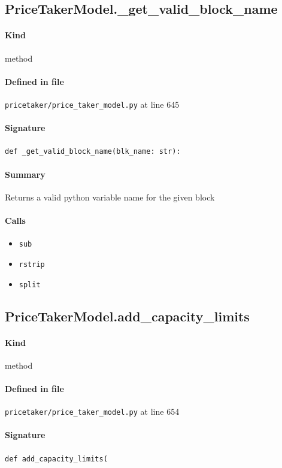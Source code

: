 \documentclass[11pt]{report}
\begin{document}
\subsection{PriceTakerModel.\_get\_valid\_block\_name}
\label{def:pricetaker-price_taker_model.py:PriceTakerModel._get_valid_block_name:L645}
\paragraph{Kind} method
\paragraph{Defined in file} \texttt{pricetaker/price\_taker\_model.py} at line 645
\paragraph{Signature} \texttt{def \_get\_valid\_block\_name(blk\_name: str):}
\paragraph{Summary} Returns a valid python variable name for the given block
\paragraph{Calls}
\begin{itemize}[leftmargin=*]
  \item \texttt{sub}
  \item \texttt{rstrip}
  \item \texttt{split}
\end{itemize}
\subsection{PriceTakerModel.add\_capacity\_limits}
\label{def:pricetaker-price_taker_model.py:PriceTakerModel.add_capacity_limits:L654}
\paragraph{Kind} method
\paragraph{Defined in file} \texttt{pricetaker/price\_taker\_model.py} at line 654
\paragraph{Signature} \texttt{def add\_capacity\_limits(}
\end{document}
